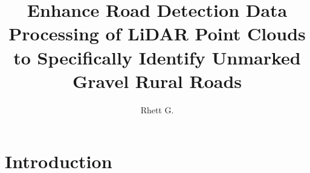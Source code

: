 \documentclass[numbered,pdftex]{ohio-etd}
\title     {Enhance Road Detection Data Processing of LiDAR Point Clouds to Specifically Identify Unmarked Gravel Rural Roads}
\author    {Rhett G.}{Huston}
\begin{document}
\makefrontmatter    %


\chapter{Introduction}
\end{document}
